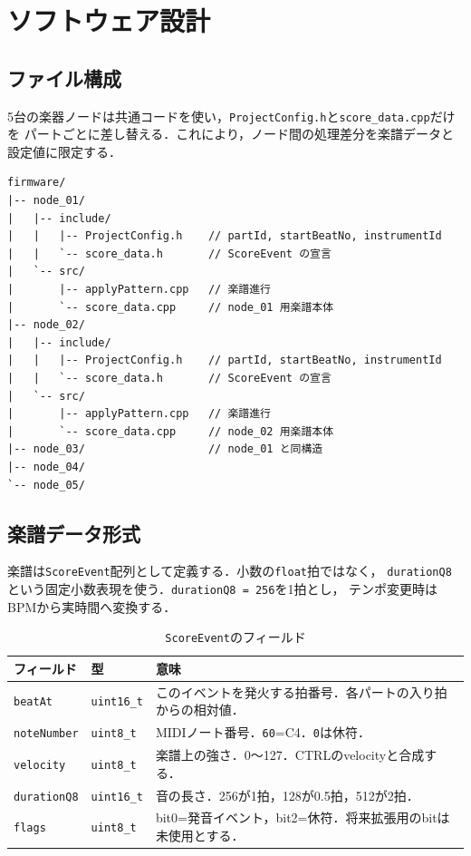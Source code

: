 \documentclass[lualatex,book,paper=a4paper,jafontsize=11.5pt,jafontscale=1.05]{jlreq}
\newcommand{\code}[1]{\texttt{#1}}
\begin{document}
\section{ソフトウェア設計}

\subsection{ファイル構成}

5台の楽器ノードは共通コードを使い，\code{ProjectConfig.h}と\code{score\_data.cpp}だけを
パートごとに差し替える．これにより，ノード間の処理差分を楽譜データと設定値に限定する．

\begin{verbatim}
firmware/
|-- node_01/
|   |-- include/
|   |   |-- ProjectConfig.h    // partId, startBeatNo, instrumentId
|   |   `-- score_data.h       // ScoreEvent の宣言
|   `-- src/
|       |-- applyPattern.cpp   // 楽譜進行
|       `-- score_data.cpp     // node_01 用楽譜本体
|-- node_02/
|   |-- include/
|   |   |-- ProjectConfig.h    // partId, startBeatNo, instrumentId
|   |   `-- score_data.h       // ScoreEvent の宣言
|   `-- src/
|       |-- applyPattern.cpp   // 楽譜進行
|       `-- score_data.cpp     // node_02 用楽譜本体
|-- node_03/                   // node_01 と同構造
|-- node_04/
`-- node_05/
\end{verbatim}

\subsection{楽譜データ形式}

楽譜は\code{ScoreEvent}配列として定義する．小数の\code{float}拍ではなく，
\code{durationQ8}という固定小数表現を使う．\code{durationQ8 = 256}を1拍とし，
テンポ変更時はBPMから実時間へ変換する．

\begin{table}[H]
\centering
\caption{\code{ScoreEvent}のフィールド}
\label{tab:saito-scoreevent}
\begin{tabular}{p{}p{}p{}}
\toprule
\textbf{フィールド} & \textbf{型} & \textbf{意味} \\
\midrule
\code{beatAt} & \code{uint16\_t} & このイベントを発火する拍番号．各パートの入り拍からの相対値．\\
\code{noteNumber} & \code{uint8\_t} & MIDIノート番号．\code{60}=C4．\code{0}は休符．\\
\code{velocity} & \code{uint8\_t} & 楽譜上の強さ．0〜127．CTRLのvelocityと合成する．\\
\code{durationQ8} & \code{uint16\_t} & 音の長さ．256が1拍，128が0.5拍，512が2拍．\\
\code{flags} & \code{uint8\_t} & bit0=発音イベント，bit2=休符．将来拡張用のbitは未使用とする．\\
\bottomrule
\end{tabular}
\end{table}
\end{document}
